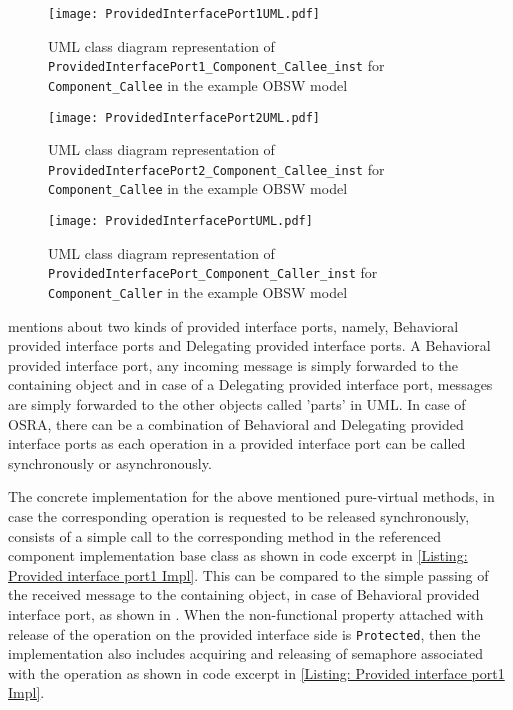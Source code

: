 \begin{figure}[h]
	\centering
	\texttt{[image: ProvidedInterfacePort1UML.pdf]}
	\caption{UML class diagram representation of \texttt{Provided\allowbreak Interface\allowbreak Port1\allowbreak\_Component\allowbreak\_Callee\allowbreak\_inst} for \texttt{Component\allowbreak\_Callee} in the example OBSW model}
	\label{fig: Provided interface port1 UML}
\end{figure}

\begin{figure}[h]
	\centering
	\texttt{[image: ProvidedInterfacePort2UML.pdf]}
	\caption{UML class diagram representation of \texttt{Provided\allowbreak Interface\allowbreak Port2\allowbreak\_Component\allowbreak\_Callee\allowbreak\_inst} for \texttt{Component\allowbreak\_Callee} in the example OBSW model}
	\label{fig: Provided interface port2 UML}
\end{figure}

\begin{figure}[h]
	\centering
	\texttt{[image: ProvidedInterfacePortUML.pdf]}
	\caption{UML class diagram representation of \texttt{Provided\allowbreak Interface\allowbreak Port\allowbreak\_Component\allowbreak\_Caller\allowbreak\_inst} for \texttt{Component\allowbreak\_Caller} in the example OBSW model}
	\label{fig: Provided interface port UML}
\end{figure}   

\cite{CBSEExample} mentions about two kinds of provided interface ports, namely, Behavioral provided interface ports and Delegating provided interface ports. A Behavioral provided interface port, any incoming message is simply forwarded to the containing object and in case of a Delegating provided interface port, messages are simply forwarded to the other objects called 'parts' in UML. In case of OSRA, there can be a combination of Behavioral and Delegating provided interface ports as each operation in a provided interface port can be called synchronously or asynchronously.  

The concrete implementation for the above mentioned pure-virtual methods, in case the corresponding operation is requested to be released synchronously, consists of a simple call to the corresponding method in the referenced component implementation base class as shown in code excerpt in \cref{Listing: Provided interface port1 Impl}. This can be compared to the simple passing of the received message to the containing object, in case of Behavioral provided interface port, as shown in \cite{CBSEExample}. When the non-functional property attached with release of the operation on the provided interface side is \texttt{Protected}, then the implementation also includes acquiring and releasing of semaphore associated with the operation as shown in code excerpt in \cref{Listing: Provided interface port1 Impl}. 

